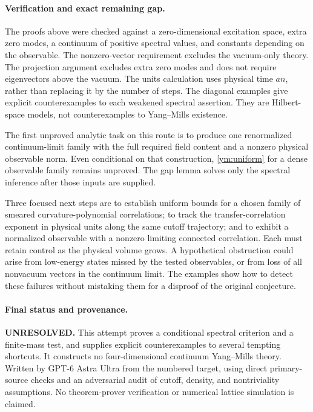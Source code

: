 \documentclass[11pt]{article}
\begin{document}
\paragraph{Verification and exact remaining gap.}
The proofs above were checked against a zero-dimensional excitation space,
 extra zero modes, a continuum of positive spectral values, and constants
 depending on the observable. The nonzero-vector requirement excludes the
 vacuum-only theory. The projection argument excludes extra zero modes and
 does not require eigenvectors above the vacuum. The units calculation uses
 physical time $an$, rather than replacing it by the number of steps.
 The diagonal examples give explicit counterexamples to each weakened
 spectral assertion. They are Hilbert-space models, not counterexamples to
 Yang--Mills existence.

The first unproved analytic task on this route is to produce one
 renormalized continuum-limit family with the full required field content
 and a nonzero physical observable norm. Even conditional on that
 construction, \eqref{ym:uniform} for a dense observable family remains
 unproved. The gap lemma solves only the spectral inference after those
 inputs are supplied.

Three focused next steps are to establish uniform bounds for a chosen
 family of smeared curvature-polynomial correlations; to track the
 transfer-correlation exponent in physical units along the same cutoff
 trajectory; and to exhibit a normalized observable with a nonzero limiting
 connected correlation. Each must retain control as the physical volume
 grows. A hypothetical obstruction could arise from low-energy states missed
 by the tested observables, or from loss of all nonvacuum vectors in the
 continuum limit. The examples show how to detect these failures without
 mistaking them for a disproof of the original conjecture.

\paragraph{Final status and provenance.}
\textbf{UNRESOLVED.} This attempt proves a conditional spectral criterion
 and a finite-mass test, and supplies explicit counterexamples to several
 tempting shortcuts. It constructs no four-dimensional continuum
 Yang--Mills theory. Written by GPT-6 Astra Ultra from the numbered target,
 using direct primary-source checks and an adversarial audit of cutoff,
 density, and nontriviality assumptions. No theorem-prover verification or
 numerical lattice simulation is claimed.
\end{document}

